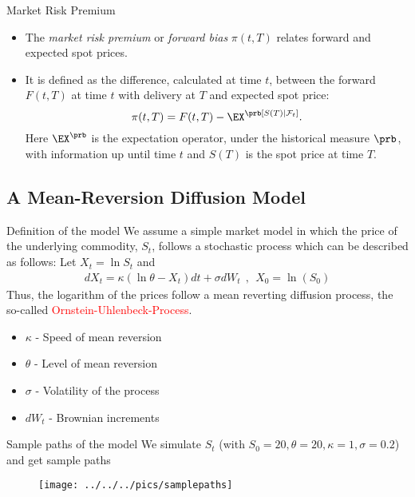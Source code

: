 {%
{Market Risk Premium}
\begin{itemize}
\item<1-> The \emph{market risk premium} or \emph{forward bias} $\pi (t,T)$
relates forward and expected spot prices.
\item<2-> It is defined as the difference, calculated at time $t$, between
the forward $F(t,T)$ at time $t$ with delivery at $T$ and expected
spot price:
\begin{equation}\label{forward risk premium}
\pi(t,T)= F(t,T)-\EX^\prb[S(T)|\mathcal F_t].
\end{equation}
Here $\EX^\prb$ is the expectation operator, under the
historical measure $\prb$, with information up until time $t$ and
$S(T)$ is the spot price at time $T$.
\end{itemize}

\subsection[Mean-Reversion Model]{A Mean-Reversion Diffusion Model}

{Definition of the model}
We assume a simple market model in which the price of the underlying commodity, $S_t$, follows a stochastic process which can be described as follows:
Let $X_t = \ln S_t$ and
\begin{align*}
	dX_t = \kappa (\ln \theta - X_t)dt + \sigma dW_t~~,~~X_0 = \ln(S_0)
\end{align*}
Thus, the logarithm of the prices follow a mean reverting diffusion process, the so-called \textcolor{red}{Ornstein-Uhlenbeck-Process}.\\
\begin{itemize}
\item $\kappa$ - Speed of mean reversion
\item $\theta$ - Level of mean reversion
\item $\sigma$ - Volatility of the process
\item $dW_t$ - Brownian increments
\end{itemize}

{Sample paths of the model}
We simulate $S_t$ (with $S_0=20, \theta = 20, \kappa = 1, \sigma = 0.2$) and get sample paths
\begin{figure}
	\centering
		\texttt{[image: ../../../pics/samplepaths]}
	\label{fig:samplepahts}
\end{figure}

}
